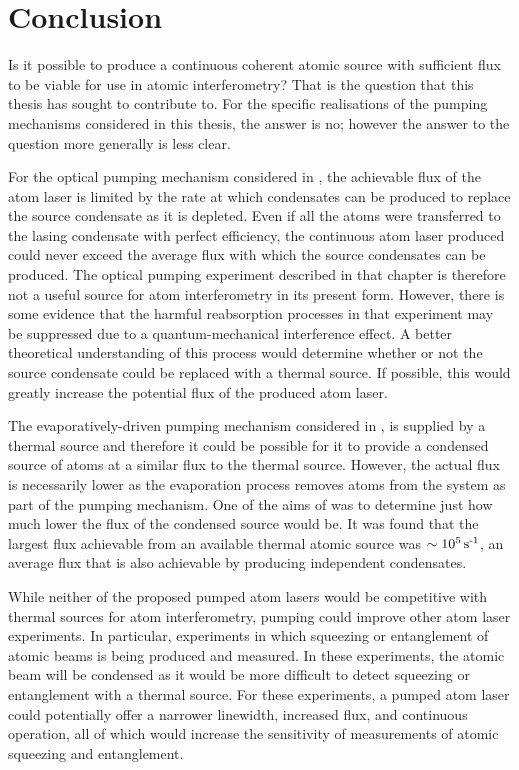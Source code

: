 \chapter{Conclusion}
\label{Conclusion}
\graphicspath{{Figures/Conclusion/}{Figures/Common/}}

Is it possible to produce a continuous coherent atomic source with sufficient flux to be viable for use in atomic interferometry?  That is the question that this thesis has sought to contribute to.  For the specific realisations of the pumping mechanisms considered in this thesis, the answer is no; however the answer to the question more generally is less clear.  

For the optical pumping mechanism considered in , the achievable flux of the atom laser is limited by the rate at which condensates can be produced to replace the source condensate as it is depleted.  Even if all the atoms were transferred to the lasing condensate with perfect efficiency, the continuous atom laser produced could never exceed the average flux with which the source condensates can be produced.  The optical pumping experiment described in that chapter is therefore not a useful source for atom interferometry in its present form.  However, there is some evidence that the harmful reabsorption processes in that experiment may be suppressed due to a quantum-mechanical interference effect.  A better theoretical understanding of this process would determine whether or not the source condensate could be replaced with a thermal source.  If possible, this would greatly increase the potential flux of the produced atom laser.

The evaporatively-driven pumping mechanism considered in , is supplied by a thermal source and therefore it could be possible for it to provide a condensed source of atoms at a similar flux to the thermal source.  However, the actual flux is necessarily lower as the evaporation process removes atoms from the system as part of the pumping mechanism.  One of the aims of  was to determine just how much lower the flux of the condensed source would be.  It was found that the largest flux achievable from an available thermal atomic source was $\sim\unit[10^5]{s\textsuperscript{-1}}$, an average flux that is also achievable by producing independent condensates.

While neither of the proposed pumped atom lasers would be competitive with thermal sources for atom interferometry, pumping could improve other atom laser experiments.  In particular, experiments in which squeezing or entanglement of atomic beams is being produced and measured.  In these experiments, the atomic beam will be condensed as it would be more difficult to detect squeezing or entanglement with a thermal source.  For these experiments, a pumped atom laser could potentially offer a narrower linewidth, increased flux, and continuous operation, all of which would increase the sensitivity of measurements of atomic squeezing and entanglement.

